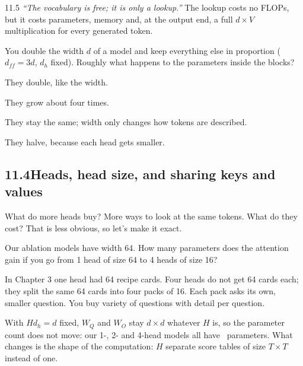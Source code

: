 \begin{wrongidea}{11.5}
\emph{``The vocabulary is free; it is only a lookup.''} The lookup costs no FLOPs, but it costs
parameters, memory and, at the output end, a full $d\times V$ multiplication for every generated token.
\end{wrongidea}

\begin{checkq}
You double the width $d$ of a model and keep everything else in proportion ($d_{ff}=3d$, $d_h$ fixed).
Roughly what happens to the parameters inside the blocks?
\begin{options}
\item They double, like the width.
\item They grow about four times.
\item They stay the same; width only changes how tokens are described.
\item They halve, because each head gets smaller.
\end{options}
\end{checkq}


\subsection*{11.4\quad Heads, head size, and sharing keys and values}

What do more heads buy? More ways to look at the same tokens. What do they cost? That is less obvious,
so let's make it exact.

\Predict Our ablation models have width 64. How many parameters does the attention gain if you go from 1
head of size 64 to 4 heads of size 16?

\Picture In Chapter 3 one head had 64 recipe cards. Four heads do not get 64 cards each; they split the
same 64 cards into four packs of 16. Each pack asks its own, smaller question. You buy variety of
questions with detail per question.

\Exactly With $H d_h=d$ fixed, $W_Q$ and $W_O$ stay $d\times d$ whatever $H$ is, so the parameter count
does not move: our 1-, 2- and 4-head models all have \nElevenPBase\ parameters. What changes is the shape
of the computation: $H$ separate score tables of size $T\times T$ instead of one.

